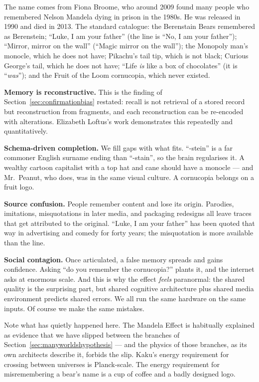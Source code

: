 The name comes from Fiona Broome, who around 2009 found many people who remembered Nelson
Mandela dying in prison in the 1980s. He was released in 1990 and died in 2013. The standard
catalogue: the Berenstain Bears remembered as Berenstein; ``Luke, I am your father'' (the line
is ``No, I am your father''); ``Mirror, mirror on the wall'' (``Magic mirror on the wall'');
the Monopoly man's monocle, which he does not have; Pikachu's tail tip, which is not black;
Curious George's tail, which he does not have; ``Life \emph{is} like a box of chocolates'' (it is
``\emph{was}''); and the Fruit of the Loom cornucopia, which never existed.


\textbf{Memory is reconstructive.} This is the finding of Section~\ref{sec:confirmationbias} restated: recall is not
retrieval of a stored record but reconstruction from fragments, and each reconstruction can be
re-encoded with alterations. Elizabeth Loftus's work demonstrates this repeatedly and
quantitatively.

\textbf{Schema-driven completion.} We fill gaps with what fits. ``-stein'' is a far commoner
English surname ending than ``-stain'', so the brain regularises it. A wealthy cartoon
capitalist with a top hat and cane should have a monocle --- and Mr.~Peanut, who does, was in the
same visual culture. A cornucopia belongs on a fruit logo.

\textbf{Source confusion.} People remember content and lose its origin. Parodies, imitations,
misquotations in later media, and packaging redesigns all leave traces that get attributed to the
original. ``Luke, I am your father'' has been quoted that way in advertising and comedy for
forty years; the misquotation is more available than the line.

\textbf{Social contagion.} Once articulated, a false memory spreads and gains confidence.
Asking ``do you remember the cornucopia?'' plants it, and the internet asks at enormous scale.
And this is why the effect \emph{feels} paranormal: the shared quality is the surprising part,
but shared cognitive architecture plus shared media environment predicts shared errors. We all
run the same hardware on the same inputs. Of course we make the same mistakes.

Note what has quietly happened here. The Mandela Effect is habitually explained as evidence that
we have slipped between the branches of Section~\ref{sec:manyworldshypothesis} --- and the physics
of those branches, as its own architects describe it, forbids the slip. Kaku's energy requirement
for crossing between universes is Planck-scale. The energy requirement for misremembering a bear's
name is a cup of coffee and a badly designed logo. 


